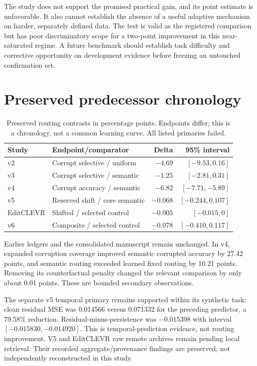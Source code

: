The study does not support the promised practical gain, and its point estimate
is unfavorable. It also cannot establish the absence of a useful adaptive
mechanism on harder, separately defined data. The test is valid as the registered
comparison but has poor discriminatory scope for a two-point improvement in
this near-saturated regime. A future benchmark should establish task difficulty
and corrective opportunity on development evidence before freezing an untouched
confirmation set.

\section{Preserved predecessor chronology}
\begin{table}[ht]\centering\small
\caption{Preserved routing contrasts in percentage points. Endpoints differ;
this is a chronology, not a common learning curve. All listed primaries failed.}
\begin{tabular}{llrr}\toprule
Study & Endpoint/comparator & Delta & 95\% interval \\\midrule
v2 & Corrupt selective / uniform & $-4.69$ & $[-9.53,0.16]$ \\
v3 & Corrupt selective / semantic & $-1.25$ & $[-2.81,0.31]$ \\
v4 & Corrupt accuracy / semantic & $-6.82$ & $[-7.71,-5.89]$ \\
v5 & Reserved shift / core semantic & $-0.068$ & $[-0.244,0.107]$ \\
EditCLEVR & Shifted / selected control & $-0.005$ & $[-0.015,0]$ \\
v6 & Composite / selected control & $-0.078$ & $[-0.410,0.117]$ \\\bottomrule
\end{tabular}\end{table}
Earlier ledgers and the consolidated manuscript remain unchanged. In v4,
expanded corruption coverage improved semantic corrupted accuracy by 27.42
points, and semantic routing exceeded learned fixed routing by 10.21 points.
Removing its counterfactual penalty changed the relevant comparison by only
about 0.01 points. These are bounded secondary observations.

The separate v5 temporal primary remains supported within its synthetic task:
clean residual MSE was 0.014566 versus 0.071332 for the preceding predictor,
a 79.58\% reduction. Residual-minus-persistence was $-0.015398$ with interval
$[-0.015830,-0.014920]$. This is temporal-prediction evidence, not routing
improvement. V5 and EditCLEVR raw remote archives remain pending local retrieval.
Their recorded aggregate/provenance findings are preserved, not independently
reconstructed in this study.

